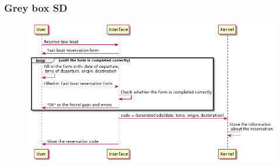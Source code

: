 \subsubsection{Grey box SD}
\creator{\studentC}
\begin{figure}[H]
\includegraphics[scale=0.6]{Iteration_3/Files/UC6_gb.png}
\end{figure}

